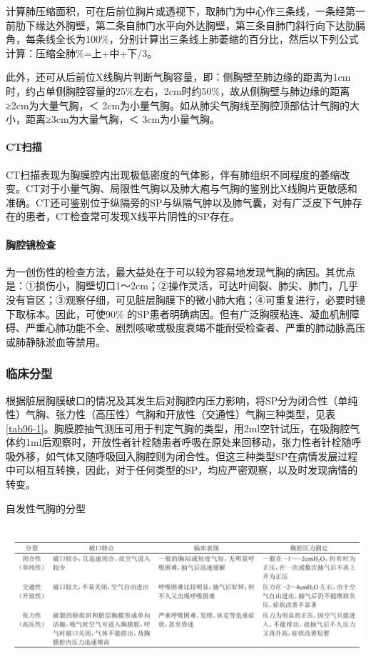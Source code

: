 计算肺压缩面积，可在后前位胸片或透视下，取肺门为中心作三条线，一条经第一前肋下缘达外胸壁，第二条自肺门水平向外达胸壁，第三条自肺门斜行向下达肋膈角，每条线全长为100\%，分别计算出三条线上肺萎缩的百分比，然后以下列公式计算：压缩全肺\%=上+中+下/3。

此外，还可从后前位X线胸片判断气胸容量，即：侧胸壁至肺边缘的距离为1cm时，约占单侧胸腔容量的25\%左右，2cm时约50\%，故从侧胸壁与肺边缘的距离≥2cm为大量气胸，＜
2cm为小量气胸。如从肺尖气胸线至胸腔顶部估计气胸的大小，距离≥3cm为大量气胸，＜
3cm为小量气胸。

\paragraph{CT扫描}

CT扫描表现为胸膜腔内出现极低密度的气体影，伴有肺组织不同程度的萎缩改变。CT对于小量气胸、局限性气胸以及肺大疱与气胸的鉴别比X线胸片更敏感和准确。CT还可鉴别位于纵隔旁的SP与纵隔气肿以及肺气囊，对有广泛皮下气肿存在的患者，CT检查常可发现X线平片阴性的SP存在。

\paragraph{胸腔镜检查}

为一创伤性的检查方法，最大益处在于可以较为容易地发现气胸的病因。其优点是：①损伤小，胸壁切口1～2cm；②操作灵活，可达叶间裂、肺尖、肺门，几乎没有盲区；③观察仔细，可见脏层胸膜下的微小肺大疱；④可重复进行，必要时镜下取标本。因此，可使90\%
的SP患者明确病因。但有广泛胸膜粘连、凝血机制障碍、严重心肺功能不全、剧烈咳嗽或极度衰竭不能耐受检查者、严重的肺动脉高压或肺静脉淤血等禁用。

\subsubsection{临床分型}

根据脏层胸膜破口的情况及其发生后对胸腔内压力影响，将SP分为闭合性（单纯性）气胸、张力性（高压性）气胸和开放性（交通性）气胸三种类型，见表\ref{tab96-1}。胸膜腔抽气测压可用于判定气胸的类型，用2ml空针试压，在吸胸腔气体约1ml后观察时，开放性者针栓随患者呼吸在原处来回移动，张力性者针栓随呼吸外移，如气体又随呼吸回入胸腔则为闭合性。但这三种类型SP在病情发展过程中可以相互转换，因此，对于任何类型的SP，均应严密观察，以及时发现病情的转变。

\begin{table}[htbp]
\centering
\caption{自发性气胸的分型}
\label{tab96-1}
\includegraphics[width=6.72917in,height=2.04167in]{./images/Image00396.jpg}
\end{table}

